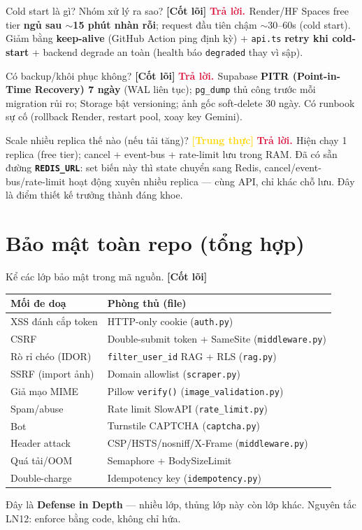\documentclass[11pt]{article}
\newcommand{\code}[1]{\texttt{\small #1}}
\newcommand{\B}[1]{\textbf{#1}}
\newcommand{\tagCore}{\textcolor{steel}{\footnotesize\textbf{[Cốt lõi]}}}
\newcommand{\tagHonest}{\textcolor{gold}{\footnotesize\textbf{[Trung thực]}}}
\newcommand{\A}{\textbf{\textcolor{crimson}{Trả lời. }}}
\begin{document}
\begin{qa}{Cold start là gì? Nhóm xử lý ra sao? \tagCore}
\A Render/HF Spaces free tier \B{ngủ sau $\sim$15 phút nhàn rỗi}; request đầu tiên chậm $\sim$30--60s (cold start). Giảm bằng \B{keep-alive} (GitHub Action ping định kỳ) + \code{api.ts} \B{retry khi cold-start} + backend degrade an toàn (health báo \code{degraded} thay vì sập).
\end{qa}

\begin{qa}{Có backup/khôi phục không? \tagCore}
\A Supabase \B{PITR (Point-in-Time Recovery) 7 ngày} (WAL liên tục); \code{pg\_dump} thủ công trước mỗi migration rủi ro; Storage bật versioning; ảnh gốc soft-delete 30 ngày. Có runbook sự cố (rollback Render, restart pool, xoay key Gemini).
\end{qa}

\begin{qa}{Scale nhiều replica thế nào (nếu tải tăng)? \tagHonest}
\A Hiện chạy 1 replica (free tier); cancel + event-bus + rate-limit lưu trong RAM. Đã có sẵn đường \B{\code{REDIS\_URL}}: set biến này thì state chuyển sang Redis, cancel/event-bus/rate-limit hoạt động xuyên nhiều replica --- cùng API, chỉ khác chỗ lưu. Đây là điểm thiết kế trưởng thành đáng khoe.
\end{qa}

\section{Bảo mật toàn repo (tổng hợp)}

\begin{qa}{Kể các lớp bảo mật trong mã nguồn. \tagCore}
\begin{center}\small
\begin{tabular}{l l}
\toprule
Mối đe doạ & Phòng thủ (file) \\
\midrule
XSS đánh cắp token & HTTP-only cookie (\code{auth.py}) \\
CSRF & Double-submit token + SameSite (\code{middleware.py}) \\
Rò rỉ chéo (IDOR) & \code{filter\_user\_id} RAG + RLS (\code{rag.py}) \\
SSRF (import ảnh) & Domain allowlist (\code{scraper.py}) \\
Giả mạo MIME & Pillow \code{verify()} (\code{image\_validation.py}) \\
Spam/abuse & Rate limit SlowAPI (\code{rate\_limit.py}) \\
Bot & Turnstile CAPTCHA (\code{captcha.py}) \\
Header attack & CSP/HSTS/nosniff/X-Frame (\code{middleware.py}) \\
Quá tải/OOM & Semaphore + BodySizeLimit \\
Double-charge & Idempotency key (\code{idempotency.py}) \\
\bottomrule
\end{tabular}
\end{center}
Đây là \B{Defense in Depth} --- nhiều lớp, thủng lớp này còn lớp khác. Nguyên tắc LN12: enforce bằng code, không chỉ hứa.
\end{qa}
\end{document}
